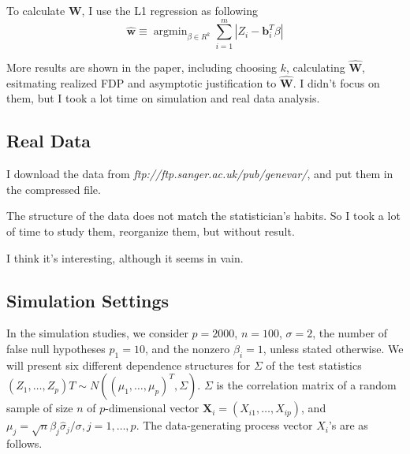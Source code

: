 \documentclass[]{article}
\begin{document}
To calculate \(\mathbf{W}\), I use the L1 regression as following
\begin{equation}
  \widehat{\mathbf{w}} \equiv \operatorname{argmin}_{\beta \in R^{k}} \sum_{i=1}^{m}\left|Z_{i}-\mathbf{b}_{i}^{T} \beta\right|
\end{equation} 

More results are shown in the paper, including choosing $k$, calculating $\hat{\mathbf{W}}$, esitmating realized FDP and asymptotic justification to $\hat{\mathbf{W}}$. 
I didn't focus on them, but I took a lot time on simulation and real data analysis. 


\hypertarget{real-data}{%
\subsection{Real Data}\label{real-data}}

I download the data from \emph{ftp://ftp.sanger.ac.uk/pub/genevar/}, and put them in the compressed file. 

The structure of the data does not match the statistician's habits. 
So I took a lot of time to study them, reorganize them, but without result. 

I think it's interesting, although it seems in vain.

\hypertarget{simulation-settings}{%
\subsection{Simulation Settings}\label{simulation-settings}}

In the simulation studies, we consider \(p = 2000\), \(n = 100\),
\(\sigma = 2\), the number of false null hypotheses \(p_1 = 10\), and
the nonzero \(\beta_i = 1\), unless stated otherwise. We will present
six different dependence structures for \(\Sigma\) of the test
statistics
\((Z_1,\dots, Z_p)T \sim N((\mu_1, \dots , \mu_p)^T ,\Sigma)\).
\(\Sigma\) is the correlation matrix of a random sample of size \(n\) of
\(p\)-dimensional vector \(\mathbf{X}_i = (X_{i1}, \dots , X_{ip})\),
and
\(\mu_j = \sqrt{n} \beta_j \hat{\sigma}_j / \sigma, j = 1, \dots , p\).
The data-generating process vector \(X_i\)'s are as follows.
\end{document}
